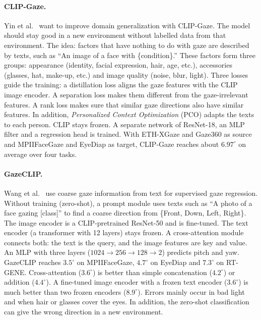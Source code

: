 \paragraph{CLIP-Gaze.}
Yin et al.~\cite{yin2024clipgaze} want to improve domain generalization with
CLIP-Gaze. The model should stay good in a new environment without labelled
data from that environment. The idea: factors that have nothing to do with
gaze are described by texts, such as \enquote{An image of a face with
\{condition\}.} These factors form three groups: appearance (identity, facial
expression, hair, age, etc.), accessories (glasses, hat, make-up, etc.) and
image quality (noise, blur, light). Three losses guide the training: a
distillation loss aligns the gaze features with the CLIP image encoder. A
separation loss makes them different from the gaze-irrelevant features. A rank
loss makes sure that similar gaze directions also have similar features. In
addition, \emph{Personalized Context Optimization} (PCO) adapts the texts to
each person. CLIP stays frozen. A separate network of ResNet-18, an MLP filter
and a regression head is trained. With ETH-XGaze and Gaze360 as source and
MPIIFaceGaze and EyeDiap as target, CLIP-Gaze reaches about $6.97^\circ$ on
average over four tasks.

\paragraph{GazeCLIP.}
Wang et al.~\cite{wang2026gazeclip} use coarse gaze information from text for
supervised gaze regression. Without training (zero-shot), a prompt module uses
texts such as \enquote{A photo of a face gazing [class]} to find a coarse
direction from \{Front, Down, Left, Right\}. The image encoder is a
CLIP-pretrained ResNet-50 and is fine-tuned. The text encoder (a transformer
with 12 layers) stays frozen. A cross-attention module connects both: the text
is the query, and the image features are key and value. An MLP with three
layers ($1024 \rightarrow 256 \rightarrow 128 \rightarrow 2$) predicts pitch and
yaw. GazeCLIP reaches $3.5^\circ$ on MPIIFaceGaze, $4.7^\circ$ on EyeDiap and
$7.3^\circ$ on RT-GENE. Cross-attention ($3.6^\circ$) is better than simple
concatenation ($4.2^\circ$) or addition ($4.4^\circ$). A fine-tuned image
encoder with a frozen text encoder ($3.6^\circ$) is much better than two frozen
encoders ($8.9^\circ$). Errors mainly occur in bad light and when hair or
glasses cover the eyes. In addition, the zero-shot classification can give the
wrong direction in a new environment.

